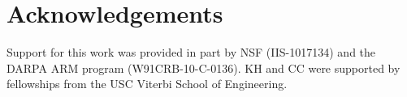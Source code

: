 \section*{Acknowledgements}
Support for this work was provided in part by NSF (IIS-1017134) and the DARPA ARM program (W91CRB-10-C-0136). KH and CC were supported by fellowships from the USC Viterbi School of Engineering.